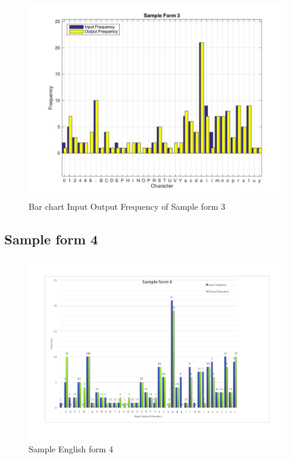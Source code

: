 \begin{figure}[H]
\centering
\includegraphics[width=1\textwidth]{Form3}
\caption {Bar chart Input Output Frequency of Sample form 3}
\label {fig:bar3}
\end{figure}


\subsection{Sample form 4}

\begin{figure}[H]
\centering
\includegraphics[width=1\textwidth]{form4}
\caption {Sample English form 4}
\label {fig:form4}
\end{figure}

